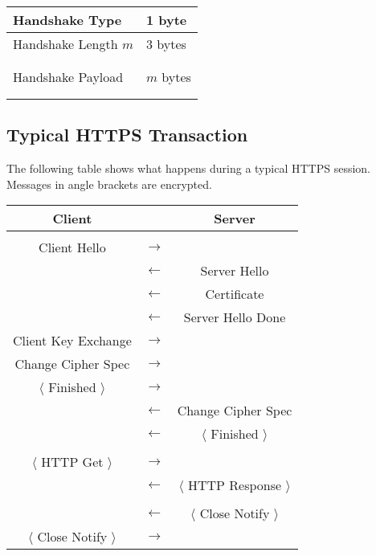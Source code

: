 \documentclass[12pt]{article}
\begin{document}
\begin{center}
\begin{tabular}{|ll|}
\hline
Handshake Type & 1 byte\\
\hline
Handshake Length $m$ & 3 bytes\\
\hline
&\\
&\\
Handshake Payload & $m$ bytes\\
&\\
&\\
\hline
\end{tabular}
\end{center}

\subsection*{Typical HTTPS Transaction}

The following table shows what happens during a
typical HTTPS session.
Messages in angle brackets are encrypted.

\begin{center}
\begin{tabular}{|ccc|}
\hline
Client & & Server\\
\hline
& & \\
Client Hello & $\longrightarrow$ &\\
& $\longleftarrow$ & Server Hello\\
& $\longleftarrow$ & Certificate\\
& $\longleftarrow$ & Server Hello Done\\
Client Key Exchange & $\longrightarrow$ &\\
Change Cipher Spec & $\longrightarrow$ &\\
$\langle$ Finished $\rangle$ & $\longrightarrow$ &\\
& $\longleftarrow$ & Change Cipher Spec\\
& $\longleftarrow$ & $\langle$ Finished $\rangle$\\
& &\\
$\langle$ HTTP Get $\rangle$ & $\longrightarrow$ & \\
& $\longleftarrow$ & $\langle$ HTTP Response $\rangle$\\
& & \\
& $\longleftarrow$ & $\langle$ Close Notify $\rangle$\\
$\langle$ Close Notify $\rangle$ & $\longrightarrow$ &\\
\hline
\end{tabular}
\end{center}
\end{document}
